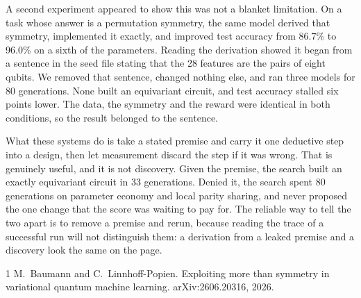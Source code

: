 \documentclass[11pt]{article}
\begin{document}
A second experiment appeared to show this was not a blanket limitation. On a task
whose answer is a permutation symmetry, the same model derived that symmetry,
implemented it exactly, and improved test accuracy from 86.7\% to 96.0\% on a
sixth of the parameters. Reading the derivation showed it began from a sentence
in the seed file stating that the 28 features are the pairs of eight qubits. We
removed that sentence, changed nothing else, and ran three models for 80
generations. None built an equivariant circuit, and test accuracy stalled six
points lower. The data, the symmetry and the reward were identical in both
conditions, so the result belonged to the sentence.

What these systems do is take a stated premise and carry it one deductive step
into a design, then let measurement discard the step if it was wrong. That is
genuinely useful, and it is not discovery. Given the premise, the search built an
exactly equivariant circuit in 33 generations. Denied it, the search spent 80
generations on parameter economy and local parity sharing, and never proposed the
one change that the score was waiting to pay for. The reliable way to tell the
two apart is to remove a premise and rerun, because reading the trace of a
successful run will not distinguish them: a derivation from a leaked premise and
a discovery look the same on the page.

\begin{thebibliography}{1}
M.~Baumann and C.~Linnhoff-Popien.
\newblock Exploiting more than symmetry in variational quantum machine learning.
\newblock arXiv:2606.20316, 2026.
\end{thebibliography}


\end{document}
